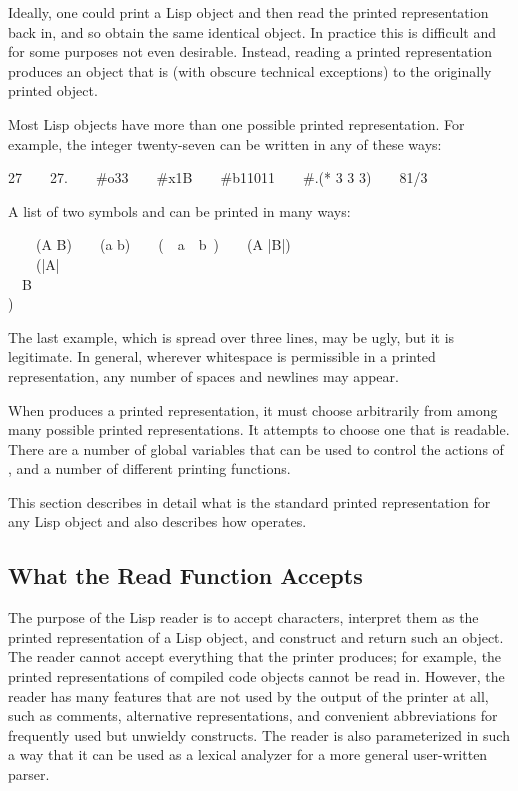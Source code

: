 Ideally, one could print a Lisp object and then read the printed
representation back in, and so obtain the same identical object.
In practice this is difficult and for some purposes not even desirable.
Instead, reading a printed representation produces an object
that is (with obscure technical exceptions)
 to the originally printed object.

Most Lisp objects have more than one possible printed representation.
For example, the integer twenty-seven can be written in any of these ways:
\begin{lisp}
27~~~~27.~~~~\#o33~~~~\#x1B~~~~\#b11011~~~~\#.(* 3 3 3)~~~~81/3
\end{lisp}
A list of two symbols  and  can be printed in many ways:
\begin{lisp}
~~~~(A B)~~~~(a b)~~~~(~~a~~b~)~~~~({\Xbackslash}A |B|) \\
~~~~(|{\Xbackslash}A| \\
~~B \\
)
\end{lisp}
The last example, which is spread over three lines, may be ugly, but it
is legitimate.  In general, wherever whitespace is permissible in a printed
representation, any number of spaces and newlines may appear.

When  produces a printed representation, it must choose arbitrarily
from among many possible printed representations.  It attempts to choose
one that is readable.  There are a number of global variables that can
be used to control the actions of , and a number of different
printing functions.

This section describes in detail what is the standard printed
representation for any Lisp object and also describes how  operates.

\subsection{What the Read Function Accepts}
\label{READER}
The purpose of the Lisp reader is to accept characters, interpret them
as the printed representation of a Lisp object, and construct and
return such an object.  The reader cannot accept everything that the
printer produces; for example, the printed representations of compiled
code objects cannot be read in.  However, the reader has
many features that are not used by the output of the printer at all,
such as comments, alternative representations, and convenient
abbreviations for frequently used but unwieldy constructs.  The reader is
also parameterized in such a way that it can be used as a lexical
analyzer for a more general user-written parser.

